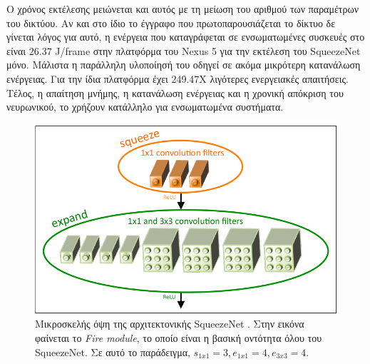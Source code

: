 Ο χρόνος εκτέλεσης μειώνεται και αυτός με τη μείωση του αριθμού των παραμέτρων του δικτύου. Αν και στο ίδιο το έγγραφο που πρωτοπαρουσιάζεται το δίκτυο δε γίνεται λόγος για αυτό, η ενέργεια που καταγράφεται σε ενσωματωμένες συσκευές στο \cite{5}  είναι 26.37 J/frame στην πλατφόρμα του Nexus 5 για την εκτέλεση του SqueezeNet μόνο. Μάλιστα η παράλληλη υλοποίησή του οδηγεί σε ακόμα μικρότερη κατανάλωση ενέργειας. Για την ίδια πλατφόρμα έχει 249.47X λιγότερες ενεργειακές απαιτήσεις. Τέλος, η απαίτηση μνήμης, η κατανάλωση ενέργειας και η χρονική απόκριση του νευρωνικού, το χρήζουν κατάλληλο για ενσωματωμένα συστήματα.

\begin{figure}[H]
\centering
\includegraphics[width = \textwidth]{figures/SqueezeNetDet/SqueezeNet_microarchitecture.png}
\caption[Αρχιτεκτονική Fire module]{Μικροσκελής όψη της αρχιτεκτονικής SqueezeNet \cite{1}. Στην εικόνα φαίνεται το \textit{Fire module}, το οποίο είναι η βασική οντότητα όλου του SqueezeNet. Σε αυτό το παράδειγμα, $ s_{1x1} = 3, e_{1x1} = 4, e_{3x3} = 4$.}
\label{fig:SqueezeNet_microarchitecture}
\end{figure}

